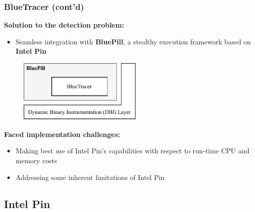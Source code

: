 \documentclass[compress]{beamer}
\begin{document}
\begin{frame}
    \frametitle{BlueTracer (cont'd)}

\textcolor{sapienza}{\textbf{Solution to the detection problem:}}
\begin{itemize}
\item Seamless integration with \textbf{BluePill}, a stealthy execution framework based on \textbf{Intel Pin}
\end{itemize}



\bigskip
	    \begin{figure}
    	\vspace{-0.3cm}
        \includegraphics[width=6cm]{image/BluePill.pdf}
    \end{figure}

\textcolor{sapienza}{\textbf{Faced implementation challenges:}}
\begin{itemize}
\item Making best use of
Intel Pin's capabilities with respect to run-time CPU and memory costs
\item Addressing some inherent limitations of Intel Pin

\end{itemize}

\end{frame}

\iffalse
\subsection{Intel Pin}
\end{document}
